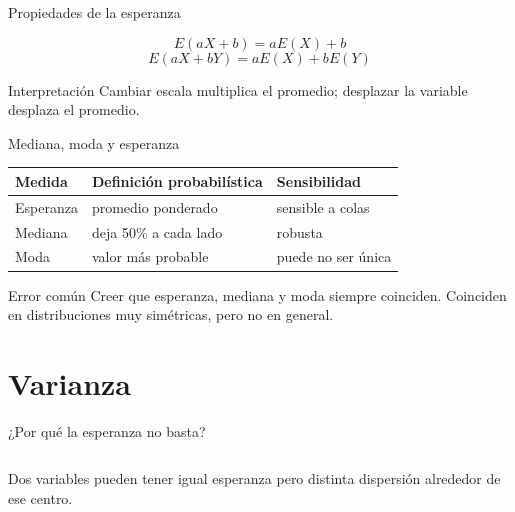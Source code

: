 \documentclass[aspectratio=169,11pt]{beamer}
\begin{document}
\begin{frame}{Propiedades de la esperanza}
\begin{theorem}[Linealidad]
\[
E(aX+b)=aE(X)+b
\]
\[
E(aX+bY)=aE(X)+bE(Y)
\]
\end{theorem}
\begin{block}{Interpretación}
Cambiar escala multiplica el promedio; desplazar la variable desplaza el promedio.
\end{block}
\end{frame}

\begin{frame}{Mediana, moda y esperanza}
\small
\begin{tabular}{p{}p{}p{}}
\toprule
Medida & Definición probabilística & Sensibilidad \\
\midrule
Esperanza & promedio ponderado & sensible a colas \\
Mediana & deja 50\% a cada lado & robusta \\
Moda & valor más probable & puede no ser única \\
\bottomrule
\end{tabular}
\begin{alertblock}{Error común}
Creer que esperanza, mediana y moda siempre coinciden. Coinciden en distribuciones muy simétricas, pero no en general.
\end{alertblock}
\end{frame}

\section{Varianza}

\begin{frame}{¿Por qué la esperanza no basta?}
\begin{columns}[T]
\begin{block}{Dos variables pueden tener igual esperanza}
pero distinta dispersión alrededor de ese centro.
\end{block}
\end{columns}
\end{frame}
\end{document}
